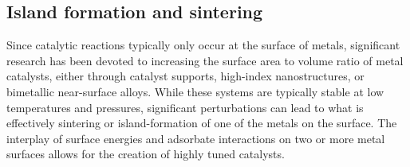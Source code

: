 \subsection{Island formation and sintering}
Since catalytic reactions typically only occur at the surface of metals,
significant research has been devoted to increasing the surface area to volume
ratio of metal catalysts, either through catalyst supports, high-index
nanostructures, or bimetallic near-surface alloys. While these systems are
typically stable at low temperatures and pressures, significant perturbations
can lead to what is effectively sintering or island-formation of one of the
metals on the surface.  The interplay of surface energies and adsorbate
interactions on two or more metal surfaces allows for the creation of
highly tuned catalysts.
